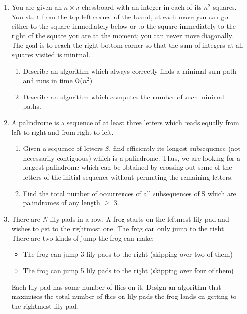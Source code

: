 \documentclass[a4paper]{article}
\begin{document}
\begin{enumerate}
				\item You are given an $n\times n$ chessboard with an integer in each of its $n^2$ squares. You start from the top left corner of the board; at each move you can go either to the square immediately below or to the square immediately to the right of the square you are at the moment; you can never move diagonally. The goal is to reach the right bottom corner so that the sum of integers at all squares visited is minimal.
						\begin{enumerate}
								\item Describe an algorithm which always correctly finds a minimal sum path and runs in time O($n^2$).
								\item Describe an algorithm which computes the number of such minimal paths.
						\end{enumerate}

				\item A palindrome is a sequence of at least three letters which reads equally from left to right and from right to left.

						\begin{enumerate}
								\item Given a sequence of letters $S$, find efficiently its longest subsequence (not necessarily contiguous) which is a palindrome. Thus, we are looking for a longest palindrome which can be obtained by crossing out some of the letters of the initial sequence without permuting the remaining letters.
								\item Find the total number of occurrences of all subsequences of S which are palindromes of any length $\geq$ 3.
						\end{enumerate}

				\item There are $N$ lily pads in a row. A frog starts on the leftmost lily pad and wishes to get to the rightmost one. The frog can only jump to the right. There are two kinds of jump the frog can make:
						\begin{itemize}
								\item The frog can jump 3 lily pads to the right (skipping over two of them)
								\item The frog can jump 5 lily pads to the right (skipping over four of them)
						\end{itemize} 
				Each lily pad has some number of flies on it. Design an algorithm that maximises the total number of flies on lily pads the frog lands on getting to the rightmost lily pad.


\end{enumerate}
\end{document}
